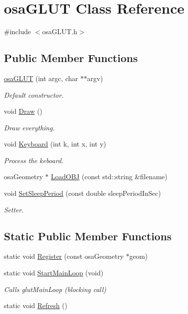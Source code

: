 \hypertarget{classosa_g_l_u_t}{}\section{osa\+G\+L\+U\+T Class Reference}
\label{classosa_g_l_u_t}


{\ttfamily \#include $<$osa\+G\+L\+U\+T.\+h$>$}

\subsection*{Public Member Functions}
\begin{DoxyCompactItemize}
\item 
\hyperlink{classosa_g_l_u_t_abb77fc0b522755ae9387287b76e99202}{osa\+G\+L\+U\+T} (int argc, char $\ast$$\ast$argv)
\begin{DoxyCompactList}\small\item\em Default constructor. \end{DoxyCompactList}\item 
void \hyperlink{classosa_g_l_u_t_a8d335ab5dd26f88cd639741892638c6b}{Draw} ()
\begin{DoxyCompactList}\small\item\em Draw everything. \end{DoxyCompactList}\item 
void \hyperlink{classosa_g_l_u_t_a5dcd0f91e6d6d18f23e2e8add4e29c1d}{Keyboard} (int k, int x, int y)
\begin{DoxyCompactList}\small\item\em Process the keboard. \end{DoxyCompactList}\item 
osa\+Geometry $\ast$ \hyperlink{classosa_g_l_u_t_ac943ced6cc1f1e6247e67f8fe7f2a8c9}{Load\+O\+B\+J} (const std\+::string \&filename)
\item 
void \hyperlink{classosa_g_l_u_t_a3a0f234d9df4fad63ee8cc552cf91c3c}{Set\+Sleep\+Period} (const double sleep\+Period\+In\+Sec)
\begin{DoxyCompactList}\small\item\em Setter. \end{DoxyCompactList}\end{DoxyCompactItemize}
\subsection*{Static Public Member Functions}
\begin{DoxyCompactItemize}
\item 
static void \hyperlink{classosa_g_l_u_t_aa77448582c922b2ed33f960812187037}{Register} (const osa\+Geometry $\ast$geom)
\item 
static void \hyperlink{classosa_g_l_u_t_a021f0ee0cfe927100384941391cb75f5}{Start\+Main\+Loop} (void)
\begin{DoxyCompactList}\small\item\em Calls glut\+Main\+Loop (blocking call) \end{DoxyCompactList}\item 
static void \hyperlink{classosa_g_l_u_t_ad6e24fe4a48bcd2e9fe2e2532f0ef577}{Refresh} ()
\end{DoxyCompactItemize}
